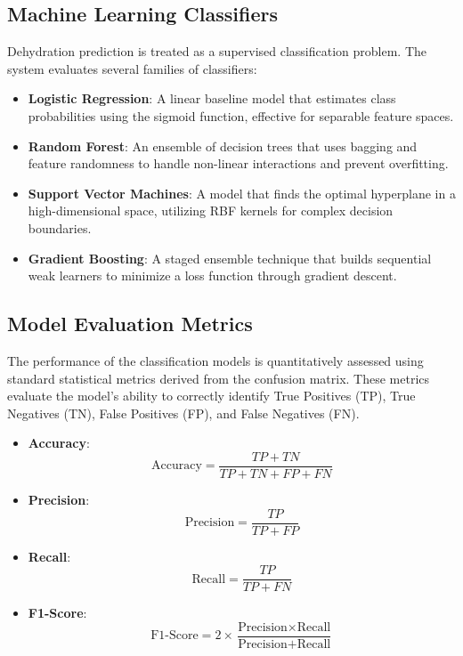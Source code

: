 \subsection{Machine Learning Classifiers}
Dehydration prediction is treated as a supervised classification problem. The system evaluates several families of classifiers:
\begin{itemize}
\item \textbf{Logistic Regression}: A linear baseline model that estimates class probabilities using the sigmoid function, effective for separable feature spaces.
\item \textbf{Random Forest}: An ensemble of decision trees that uses bagging and feature randomness to handle non-linear interactions and prevent overfitting.
\item \textbf{Support Vector Machines}: A model that finds the optimal hyperplane in a high-dimensional space, utilizing RBF kernels for complex decision boundaries.
\item \textbf{Gradient Boosting}: A staged ensemble technique that builds sequential weak learners to minimize a loss function through gradient descent.
\end{itemize}

\subsection{Model Evaluation Metrics}
The performance of the classification models is quantitatively assessed using standard statistical metrics derived from the confusion matrix. These metrics evaluate the model's ability to correctly identify True Positives (TP), True Negatives (TN), False Positives (FP), and False Negatives (FN).

\begin{itemize}
\item \textbf{Accuracy}: 
\begin{equation}
\label{eq:accuracy}
\text{Accuracy} = \frac{TP + TN}{TP + TN + FP + FN}
\end{equation}

\item \textbf{Precision}: 
\begin{equation}
\label{eq:precision}
\text{Precision} = \frac{TP}{TP + FP}
\end{equation}

\item \textbf{Recall}: 
\begin{equation}
\label{eq:recall}
\text{Recall} = \frac{TP}{TP + FN}
\end{equation}

\item \textbf{F1-Score}: 
\begin{equation}
\label{eq:f1-score}
\text{F1-Score} = 2 \times \frac{\text{Precision} \times \text{Recall}}{\text{Precision} + \text{Recall}}
\end{equation}
\end{itemize}
